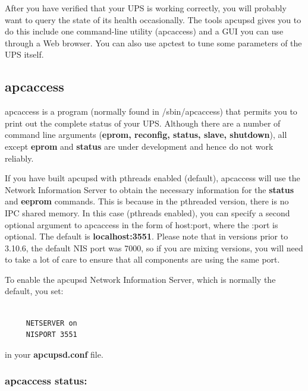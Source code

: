 {{{{\label{index-Monitoring-109}
\label{index-Tuning-110}
After you have verified that your UPS is working correctly, you will probably
want to query the state of its health occasionally. The tools apcupsd gives
you to do this include one command-line utility (apcaccess) and a GUI you can
use through a Web browser.  You can also use apctest to tune some parameters
of the UPS itself. 

\label{apcaccess}

\subsection*{apcaccess}

\label{index-apcaccess-111}
apcaccess is a program (normally found in /sbin/apcaccess) that permits you to
print out the complete status of your UPS. Although there are a number of
command line arguments ({\bf eprom, reconfig, status, slave, shutdown}), all
except {\bf eprom} and {\bf status} are under development and hence do not
work reliably.  

If you have built apcupsd with pthreads enabled (default), apcaccess will use
the Network Information Server to obtain the necessary information for the
{\bf status} and {\bf eeprom} commands. This is because in the pthreaded
version, there is no IPC shared memory. In this case (pthreads enabled), you
can specify a second optional argument to apcaccess in the form of host:port,
where the :port is optional. The default is {\bf localhost:3551}. Please note
that in versions prior to 3.10.6, the default NIS port was 7000, so if you are
mixing versions, you will need to take a lot of care to ensure that all
components are using the same port.  

To enable the apcupsd Network Information Server, which is normally the
default, you set: 

\footnotesize
\begin{verbatim}
     
     NETSERVER on
     NISPORT 3551
\end{verbatim}
\normalsize

in your {\bf apcupsd.conf} file. 

\label{apcaccess-status}

\subsubsection*{apcaccess status:}

}}}}
